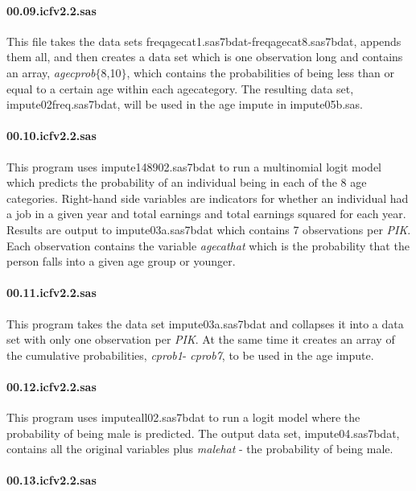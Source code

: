 \paragraph{00.09.icfv2.2.sas}

This file takes the data sets freqagecat1.sas7bdat-freqagecat8.sas7bdat,
appends them all, and then creates a data set which is one observation long
and contains an array, \textit{agecprob}$\lbrace$8,10$\rbrace$, which
contains the probabilities of being less than or equal to a certain age
within each agecategory. The resulting data set, impute02freq.sas7bdat, will
be used in the age impute in impute05b.sas.

\paragraph{00.10.icfv2.2.sas}

This program uses impute148902.sas7bdat to run a multinomial logit model
which predicts the probability of an individual being in each of the 8 age
categories. Right-hand side variables are indicators for whether an
individual had a job in a given year and total earnings and total earnings
squared for each year. Results are output to impute03a.sas7bdat which
contains 7 observations per \textit{PIK}. Each observation contains the
variable \textit{agecathat} which is the probability that the person falls
into a given age group or younger.

\paragraph{00.11.icfv2.2.sas}

This program takes the data set impute03a.sas7bdat and collapses it into a
data set with only one observation per \textit{PIK}. At the same time it
creates an array of the cumulative probabilities, \textit{cprob1}- \textit{%
cprob7}, to be used in the age impute.

\paragraph{00.12.icfv2.2.sas}

This program uses imputeall02.sas7bdat to run a logit model where the
probability of being male is predicted. The output data set,
impute04.sas7bdat, contains all the original variables plus \textit{malehat}
- the probability of being male.

\paragraph{00.13.icfv2.2.sas}

